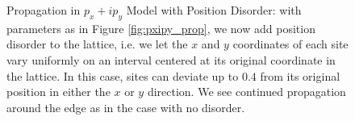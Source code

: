 \documentclass[a4paper]{article}
\begin{document}
\begin{figure}
%
%

%
%
\caption{Propagation in $p_x + ip_y$ Model with Position Disorder: with parameters as in Figure \ref{fig:pxipy_prop}, we now add position disorder to the lattice, i.e. we let the $x$ and $y$ coordinates of each site vary uniformly on an interval centered at its original coordinate in the lattice.
In this case, sites can deviate up to $0.4$ from its original position in either the $x$ or $y$ direction.
We see continued propagation around the edge as in the case with no disorder.
}%
\label{fig:pos_dis_prop}%
\end{figure}
\end{document}
